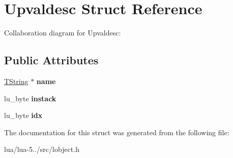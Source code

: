 \hypertarget{struct_upvaldesc}{\section{Upvaldesc Struct Reference}
\label{struct_upvaldesc}
}


Collaboration diagram for Upvaldesc\+:
\subsection*{Public Attributes}
\begin{DoxyCompactItemize}
\item 
\hypertarget{struct_upvaldesc_a8870289fbc6611275d093ef1c08cf9ed}{\hyperlink{union_t_string}{T\+String} $\ast$ {\bfseries name}}\label{struct_upvaldesc_a8870289fbc6611275d093ef1c08cf9ed}

\item 
\hypertarget{struct_upvaldesc_a1e5182ac7b8b72848ed71b7b4844e3d1}{lu\+\_\+byte {\bfseries instack}}\label{struct_upvaldesc_a1e5182ac7b8b72848ed71b7b4844e3d1}

\item 
\hypertarget{struct_upvaldesc_a8478ecca9cb593200c562a0837aedfac}{lu\+\_\+byte {\bfseries idx}}\label{struct_upvaldesc_a8478ecca9cb593200c562a0837aedfac}

\end{DoxyCompactItemize}


The documentation for this struct was generated from the following file\+:\begin{DoxyCompactItemize}
\item 
lua/lua-\/5../src/lobject.\+h\end{DoxyCompactItemize}

